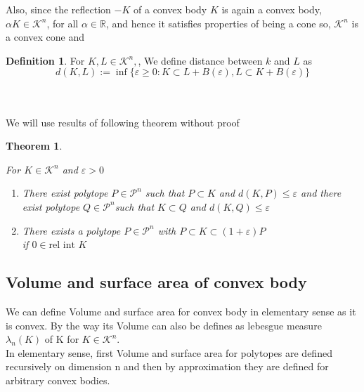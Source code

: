 \documentclass[oneside]{book}
\newtheorem{theorem}{Theorem}[section]
\theoremstyle{definition}
\newtheorem{mydef}{Definition}[chapter]
\begin{document}
Also, since the reflection $-K$ of a convex body $K$ is again a convex body, $\alpha K \in \mathcal{K}^{n}$, for all $\alpha \in \mathbb{R}$, and hence it satisfies properties of being a cone so,  $\mathcal{K}^{n}$ is a convex cone and 






\begin{mydef}	

For  $ K, L \in \mathcal{K}^{n}, $, We define distance between $k$ and $L$ as 
\begin{equation}
\label{eq42}
d(K, L):=\inf \{\varepsilon \geq 0: K \subset L+B(\varepsilon), L \subset K+B(\varepsilon)\}
\end{equation}
\end{mydef}
\quad 
\\\\
We will use results of following theorem without proof 

\begin{theorem}
\label{t:8}


For  $K \in \mathcal{K}^{n}$ and $\varepsilon>0$ \\

\begin{enumerate}
\item
There exist  polytope $ P  \in \mathcal{P}^{n}$ such that  $P \subset K$ and  $d(K, P) \leq \varepsilon$ \newline 
and \newline
  there exist polytope $Q \in \mathcal{P}^{n}$such that  $K \subset Q$ and $d(K, Q) \leq \varepsilon$ 
\item 
  There exists a polytope $P \in \mathcal{P}^{n}$ with $P \subset K \subset(1+\varepsilon) P$ \\
  if $0 \in \text{rel int } K $ \label{4.1.5}
\end{enumerate}
\end{theorem}















 \subsection{Volume and surface area of convex body}
We can define Volume and surface area for convex body in elementary sense as it is convex. By the way its Volume can also be defines as lebesgue measure $\lambda_{n}(K)$ of K  for $ K \in  \mathcal{K}^{n} $. \\
In elementary sense, first Volume and surface area for polytopes are defined recursively on dimension n and then by approximation they are defined for  arbitrary convex bodies. \newline
\end{document}
